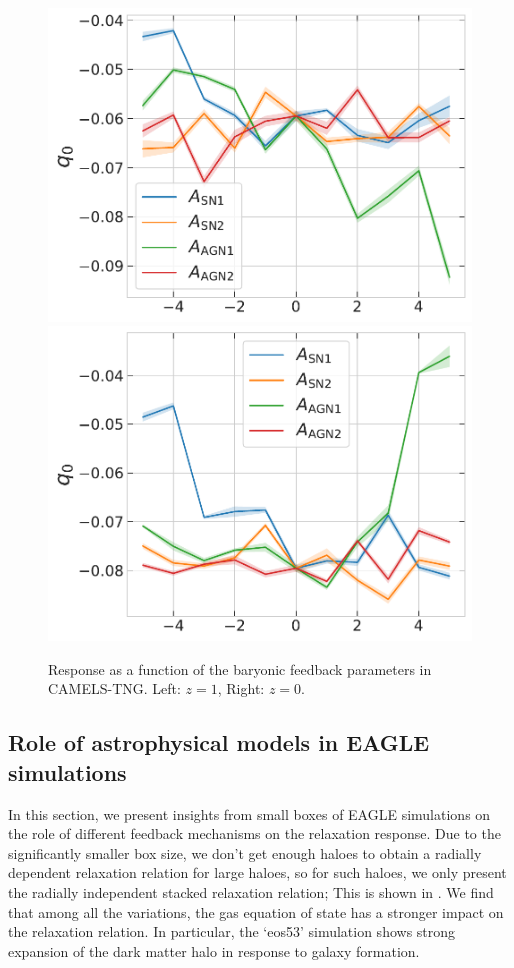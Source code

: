 \begin{figure}[htbp]
\centering
\includegraphics[width=0.49\linewidth]{plots/CAMELS_I_q0_sn18.pdf}
\includegraphics[width=0.49\linewidth]{plots/CAMELS_I_q0_sn33.pdf}
\caption[]{Response as a function of the baryonic feedback parameters in CAMELS-TNG. Left: $z=1$, Right: $z=0$.}
\label{fig:camels-q0q1}
\end{figure}









\subsection{Role of astrophysical models in EAGLE simulations}
\label{sec:res-physvar-eagle}
In this section, we present insights from small boxes of EAGLE simulations on the role of different feedback mechanisms on the relaxation response.
Due to the significantly smaller box size, we don't get enough haloes to obtain a radially dependent relaxation relation for large haloes, so for such haloes, we only present the radially independent stacked relaxation relation; This is shown in . We find that among all the variations, the gas equation of state has a stronger impact on the relaxation relation. In particular, the `eos53' simulation shows strong expansion of the dark matter halo in response to galaxy formation.

